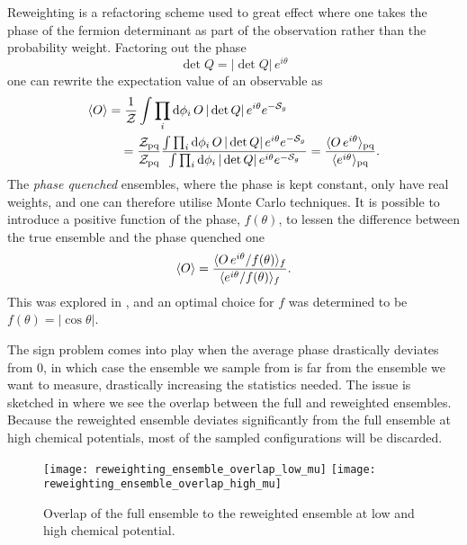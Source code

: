 Reweighting is a refactoring scheme used to great effect where one takes the
phase of the fermion determinant as part of the observation rather than the
probability weight. Factoring out the phase
%
\begin{equation}
  \det Q = |\det Q| \, e^{i\theta}
\end{equation}
%
one can rewrite the expectation value of an observable as
%
\begin{align}
  \langle O \rangle  &=
  \frac{1}{\mathcal{Z}}\int \prod_i \mathrm{d} \phi_i \, O \, | \det
    Q | \, e^{i \theta} e^{-\mathcal{S}_g} \nonumber\\
  & \hskip1em = \frac{\mathcal{Z}_{\text{pq}}}{\mathcal{Z}_{\text{pq}}}
  \frac{\int \prod_i \mathrm{d} \phi_i \, O \, | \det
    Q | \, e^{i \theta} e^{-\mathcal{S}_g}}{%
  \int \prod_i \mathrm{d} \phi_i \, | \det
    Q | \, e^{i \theta} e^{-\mathcal{S}_g}}
  = \frac{\langle O \, e^{i\theta} \rangle_{\text{pq}}}{\langle e^{i\theta} \rangle_{\text{pq}}} .
\end{align}
%
The \emph{phase quenched} ensembles, where the phase is kept constant, only have
real weights, and one can therefore utilise Monte Carlo techniques. It is
possible to introduce a positive function of the phase, $f(\theta)$, to lessen
the difference between the true ensemble and the phase quenched one
%
\begin{equation}
  \langle O \rangle
  = \frac{\langle O \, e^{i\theta} / f(\theta) \rangle_f}{%
    \langle e^{i\theta} / f(\theta) \rangle_f} .
\end{equation}
%
This was explored in \citep{deForcrand:2002pa}, and an optimal choice for $f$
was determined to be $f(\theta) = |\cos\theta|$.

The sign problem comes into play when the average phase drastically deviates
from $0$, in which case the ensemble we sample from is far from the ensemble we
want to measure, drastically increasing the statistics needed. The issue is
sketched in  where we see the overlap between
the full and reweighted ensembles. Because the reweighted ensemble deviates
significantly from the full ensemble at high chemical potentials, most of the
sampled configurations will be discarded.

\begin{figure}
  \texttt{[image: reweighting\_ensemble\_overlap\_low\_mu]}
  \texttt{[image: reweighting\_ensemble\_overlap\_high\_mu]}
  \caption{Overlap of the full ensemble to the reweighted ensemble at low and
    high chemical potential.}
  \label{fig-reweighting-overlap}
\end{figure}

